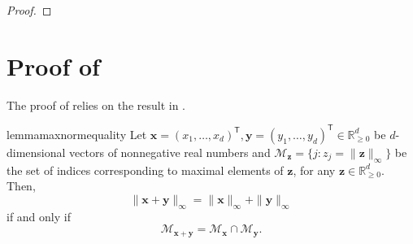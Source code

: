 \documentclass[letterpaper]{article} %
\newcommand{\R}{{\mathbb{R}}}
\newcommand{\Pm}{{\mathbb{P}}}
\newcommand{\bx}{{\bm{x}}}
\newcommand{\bz}{{\bm{z}}}
\newcommand{\by}{{\bm{y}}}
\newcommand{\T}{{\mathsf{T}}}
\newcommand{\gvn}{\,|\,}
\newcommand{\sM}{{\mathscr{M}}}
\begin{document}
\begin{proof}
\end{proof}







\section{Proof of }
\label{app:early_stopping}
The proof of  relies on the result in .

\begin{restatable}[]{lemma}{maxnormequality}
    \label{lemma:max-norm-equality}
    Let $\bx=(x_1,\ldots,x_d)^\T,\by=(y_1,\ldots,y_d)^\T\in \R_{\geq 0}^d$ be $d$-dimensional vectors of nonnegative real numbers and
    $\sM_{\bz}=\{j:z_j=\|\bz\|_\infty\}$
    be the set of indices corresponding to maximal elements of $\bz$, for any $\bz\in \R_{\geq 0}^d$. Then,
    \[
        \|\bx+\by\|_\infty = \|\bx\|_\infty + \|\by\|_\infty
    \]
    if and only if
    \[
        \sM_{\bx+\by} = \sM_{\bx}\cap \sM_{\by}.
    \]
\end{restatable}
\end{document}
